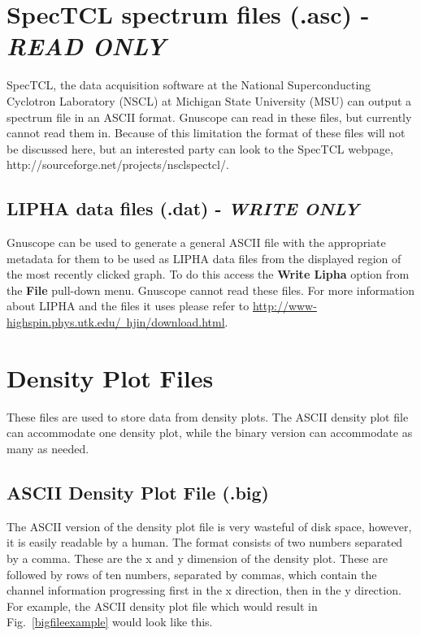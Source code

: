 \section{SpecTCL spectrum files (.asc) - {\it READ ONLY}}

SpecTCL, the data acquisition software at the National Superconducting Cyclotron Laboratory (NSCL) at Michigan State University (MSU) can output a spectrum file in an ASCII format.  Gnuscope can read in these files, but currently cannot read them in.  Because of this limitation the format of these files will not be discussed here, but an interested party can look to the SpecTCL webpage, http://sourceforge.net/projects/nsclspectcl/.

 \subsection{LIPHA data files (.dat) - {\it WRITE ONLY}}

Gnuscope can be used to generate a general ASCII file with the appropriate metadata for them to be used as LIPHA data files from the displayed region of the most recently clicked graph.  To do this access the {\bf Write Lipha} option from the {\bf File} pull-down menu.  Gnuscope cannot read these files.  For more information about LIPHA and the files it uses please refer to \underline{http://www-highspin.phys.utk.edu/~hjin/download.html}.

\section{Density Plot Files}

These files are used to store data from density plots.  The ASCII density plot file can accommodate one density plot, while the binary version can accommodate as many as needed.

 \subsection{ASCII Density Plot File (.big)}

The ASCII version of the density plot file is very wasteful of disk space, however, it is easily readable by a human.  The format consists of two numbers separated by a comma.  These are the x and y dimension of the density plot.  These are followed by rows of ten numbers, separated by commas, which contain the channel information progressing first in the x direction, then in the y direction.  For example, the ASCII density plot file which would result in Fig.~\ref{bigfileexample} would look like this.

